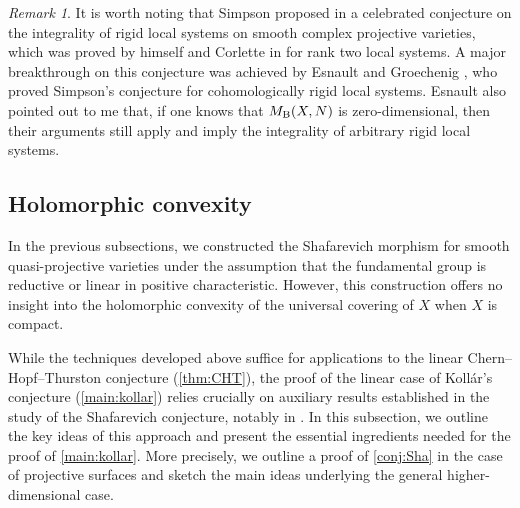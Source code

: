 \documentclass[english]{amsproc}
\theoremstyle{plain}
\theoremstyle{definition}
\theoremstyle{remark}
\newtheorem{rem}[thm]{Remark}
\theoremstyle{plain}
\numberwithin{equation}{thm} %
\begin{document}
\begin{rem}
It is worth noting that Simpson proposed in \cite{Sim92} a celebrated conjecture on the 
integrality of rigid local systems on smooth complex projective varieties, which was proved by 
himself and Corlette in \cite{CS08} for rank two local systems.
	A major breakthrough on this conjecture was achieved by Esnault and Groechenig
	\cite{EG18,EG25b}, who proved Simpson's conjecture for cohomologically rigid local
	systems.    Esnault also pointed out to me that, if one knows that $M_{\rm B}(X,N)$ is
	zero-dimensional, then their arguments still apply and imply the integrality of
	arbitrary rigid local systems.
\end{rem} 







\subsection{Holomorphic convexity}
In the previous subsections, we constructed the Shafarevich morphism for smooth quasi-projective varieties under the assumption that the fundamental group is reductive or linear in positive characteristic. However, this construction offers no insight into the holomorphic convexity of the universal covering of $X$ when $X$ is compact.

While the techniques developed above suffice for applications to the linear 
Chern--Hopf--Thurston conjecture (\cref{thm:CHT}), the proof of the linear case of 
Koll\'ar’s conjecture (\cref{main:kollar}) relies crucially on auxiliary results 
established in the study of the Shafarevich conjecture, notably in 
\cite{Eys04,DY23,EKPR12}. 
In this subsection, we outline the key ideas of this approach and present the 
essential ingredients needed for the proof of \cref{main:kollar}. 
More precisely, we  outline  a proof of \cref{conj:Sha} in the case of projective surfaces 
and sketch the main ideas underlying the general higher-dimensional case.
\end{document}
